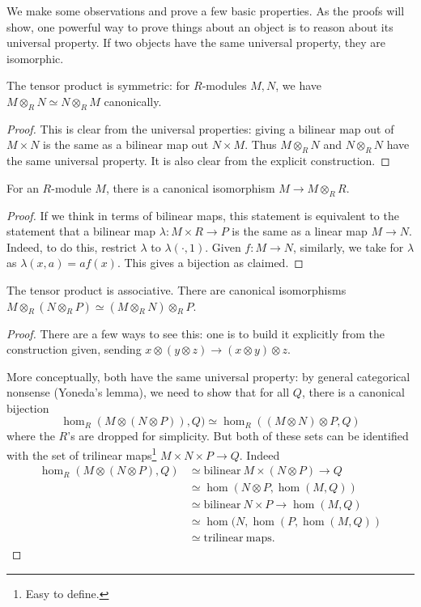 We make some observations and prove a few basic properties. As the proofs will
show, one powerful way to prove things about an object is to reason about its
universal property. If two objects have the same universal property, they are
isomorphic.

\begin{proposition}
The tensor product is symmetric: for $R$-modules $M,N$, we have $M \otimes_R
N \simeq N \otimes_R M$
canonically.
\end{proposition}
\begin{proof}
This is clear from the universal properties: giving a bilinear map
out of  $M \times N$ is the same as a bilinear map out $N \times M$.
Thus $M \otimes_R N$ and $N \otimes_R N$ have the same universal property.
It is also
clear from the explicit construction.
\end{proof}

\begin{proposition}
For an $R$-module $M$, there is a canonical isomorphism $M \to M \otimes_R R$.
\end{proposition}
\begin{proof}
  If we think in terms of
bilinear maps, this statement is equivalent to the statement that a bilinear
map $\lambda: M \times R \to P$ is the same as a linear map $M \to N$. Indeed,
to do
this, restrict $\lambda$ to $\lambda(\cdot, 1)$.  Given $f: M \to N$,
similarly, we take for $\lambda$ as $\lambda(x,a) = af(x)$. This gives a
bijection as claimed.
\end{proof}

\begin{proposition}
The tensor product is associative.  There are canonical isomorphisms $M
\otimes_R (N \otimes_R P) \simeq (M
\otimes_R N) \otimes_R P$.
\end{proposition}
\begin{proof}
 There are a few ways to see this: one is to build
it explicitly from the construction given, sending $x \otimes (y \otimes z) \to
(x \otimes y) \otimes z$.

More conceptually, both have the same universal
property: by general categorical nonsense (Yoneda's lemma), we need to show
that for all $Q$, there is  a canonical bijection
\[ \hom_R(M \otimes (N \otimes P)), Q) \simeq \hom_R( (M \otimes N)
\otimes P, Q)  \]
where the $R$'s are dropped for simplicity.  But both of these sets can be
identified with the set of trilinear maps\footnote{Easy to define.} $M \times N
\times P \to Q$. Indeed
\begin{align*}
\hom_R(M \otimes (N \otimes P), Q) & \simeq \mathrm{bilinear} \ M \times (N
\otimes P) \to Q \\
& \simeq \hom(N \otimes P, \hom(M,Q)) \\
& \simeq \mathrm{bilinear} \ N \times P \to \hom(M,Q) \\
& \simeq \hom(N, \hom(P, \hom(M,Q)) \\
& \simeq \mathrm{trilinear\  maps}.
\end{align*}

\end{proof}


